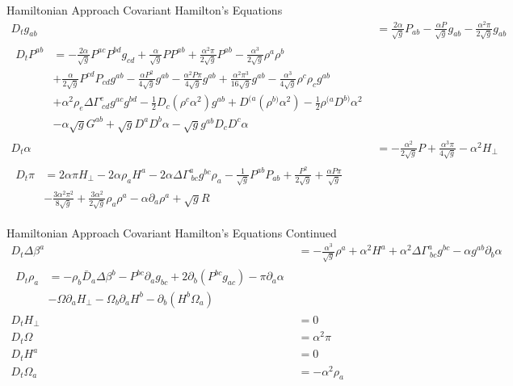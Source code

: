 \documentclass[xcolor=dvipsnames]{beamer}
\begin{document}
	\begin{frame}{Hamiltonian Approach}
		Covariant Hamilton's Equations
		\small
		\begin{align*}
		D_{t}g_{ab} & = \frac{2\alpha}{\sqrt{g}}P_{ab} - \frac{\alpha P}{\sqrt{g}}g_{ab} - \frac{\alpha^{2}\pi}{2\sqrt{g}}g_{ab}\\
		\begin{split}
		D_{t} P^{ab} & = - \frac{2\alpha}{\sqrt{g}}P^{ac}P^{bd}g_{cd} + \frac{\alpha}{\sqrt{g}}PP^{ab} + \frac{\alpha^{2}\pi}{2\sqrt{g}
		}P^{ab} - \frac{\alpha^{3}}{2\sqrt{g}}\rho^{a}\rho^{b}\\
		& + \frac{\alpha}{2\sqrt{g}}P^{cd}P_{cd}g^{ab} - \frac{\alpha P^{2}}{4\sqrt{g}}g^{ab} - \frac{\alpha^{2}P\pi}{4\sqrt{g}}g^{ab} + \frac{\alpha^{2}\pi^{3}}{16\sqrt{g}}g^{ab} - \frac{\alpha^{3}}{4\sqrt{g}}\rho^{c}\rho_{c}g^{ab}\\
		& + \alpha^{2}\rho_{e}\Delta \Gamma^{e}_{~cd}g^{ac}g^{bd} - \frac{1}{2}D_{c}\left(\rho^{c}\alpha^{2}\right)g^{ab} + D^{(a}\left(\rho^{b)}\alpha^{2}\right) - \frac{1}{2}\rho^{(a}D^{b)}\alpha^{2}\\
		& - \alpha \sqrt{g}G^{ab} + \sqrt{g}D^{a}D^{b}\alpha - \sqrt{g}g^{ab}D_{c}D^{c}\alpha
		\end{split}\\
		D_{t}\alpha & = - \frac{\alpha^{2}}{2\sqrt{g}}P + \frac{\alpha^{3}\pi}{4\sqrt{g}} - \alpha^{2}H_{\perp}\\
		\begin{split}
		D_{t}\pi & = 2\alpha\pi H_{\perp} - 2\alpha \rho_{a}H^{a} - 2\alpha\Delta \Gamma^{a}_{~bc}g^{bc}\rho_{a} - \frac{1}{\sqrt{g}}P^{ab}P_{ab} + \frac{P^{2}}{2\sqrt{g}} + \frac{\alpha P \pi}{\sqrt{g}}\\
		& - \frac{3\alpha^{2}\pi^{2}}{8\sqrt{g}} + \frac{3\alpha^{2}}{2\sqrt{g}}\rho_{a}\rho^{a} - \alpha \partial_{a}\rho^{a} + \sqrt{g}R
		\end{split}
	\end{align*}
	\end{frame}
	\begin{frame}{Hamiltonian Approach}
		Covariant Hamilton's Equations \tiny{Continued}
		\small
		\begin{align*}
		D_{t}\Delta \beta^{a} & = - \frac{\alpha^{3}}{\sqrt{g}}\rho^{a} + \alpha^{2}H^{a} + \alpha^{2}\Delta \Gamma^{a}_{~bc}g^{bc} - \alpha g^{ab}\partial_{b}\alpha\\
		\begin{split}
		D_{t}\rho_{a} & = - \rho_{b}{\bar D}_{a}\Delta\beta^{b} - P^{bc}\partial_{a}g_{bc} + 2\partial_{b}\left(P^{bc}g_{ac}\right) - \pi \partial_{a}\alpha\\
		& - \Omega \partial_{a}H_{\perp} - \Omega_{b}\partial_{a}H^{b} - \partial_{b}\left(H^{b} \Omega_{a}\right)
		\end{split}\\
		D_{t}H_{\perp} & = 0\\
		D_{t}\Omega & = \alpha^{2}\pi \\
		D_{t}H^{a} & = 0\\
		D_{t}\Omega_{a} & = -\alpha^{2}\rho_{a}
		\end{align*}
	\end{frame}
\end{document}
